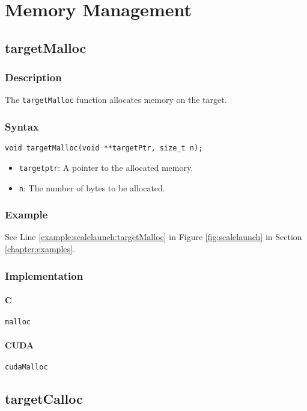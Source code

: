 \chapter{Memory Management}



\newpage
\section{targetMalloc}

\subsection{Description}

The \verb+targetMalloc+ function allocates memory on the target.

\subsection{Syntax}
\begin{verbatim}
void targetMalloc(void **targetPtr, size_t n);
\end{verbatim}

\begin{itemize}
\item \verb+targetptr+: A pointer to the allocated memory.
\item \verb+n+: The number of bytes to be allocated.
\end{itemize}


\subsection{Example}
See Line \ref{example:scalelaunch:targetMalloc} in Figure \ref{fig:scalelaunch} in Section \ref{chapter:examples}.
\subsection{Implementation}
\subsubsection{C}
\verb+malloc+
\subsubsection{CUDA}
\verb+cudaMalloc+

\newpage
\section{targetCalloc}

